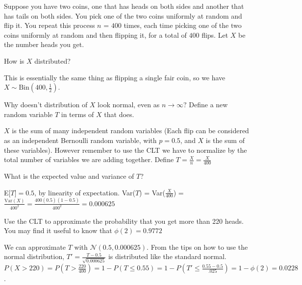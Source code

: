 Suppose you have two coins, one that has heads on both sides and another that has tails on both sides. You pick one of the two coins uniformly at random and flip it. You repeat this process $n$ = $400$ times, each time picking one of the two coins uniformly at random and then flipping it, for a total of $400$ flips. Let $X$ be the number heads you get.

\begin{question}
How is $X$ distributed?

\begin{solution}
This is essentially the same thing as flipping a single fair coin, so we have $X \mathtt{\sim} \mathrm{Bin}(400, \frac{1}{2})$.
\end{solution}
\end{question}

\begin{question}
Why doesn't distribution of $X$ look normal, even as $n \to \infty?$  Define a new random variable $T$ in terms of $X$ that does.

\begin{solution}
$X$ is the sum of many independent random variables (Each flip can be considered as an independent Bernoulli random variable, with $p = 0.5$, and $X$ is the sum of these variables). However remember to use the CLT we have to normalize by the total number of variables we are adding together. Define $T = \frac{X}{n} = \frac{X}{400}$
\end{solution}
\end{question}

\begin{question}
What is the expected value and variance of $T$?

\begin{solution}
E[$T] = 0.5$, by linearity of expectation. Var($T$) = Var($\frac{X}{400}$)  = $\frac{\text{Var}(X)}{400^2} = \frac{400(0.5)(1-0.5)}{400^2} = 0.000625$
\end{solution}
\end{question}

\begin{question}
Use the CLT to approximate the probability that you get more than 220 heads. You may find it useful to know that $\phi(2) = 0.9772$

\begin{solution}
We can approximate $T$ with $\mathcal{N}(0.5, 0.000625)$. From the tips on how to use the normal distribution, $T' = \frac{T-0.5}{\sqrt{0.000625}}$ is distributed like the standard normal. 
$P(X>220) = P(T>\frac{220}{400}) = 1 - P(T \leq 0.55) = 1 - P(T' \leq \frac{0.55-0.5}{.025}) = 1 - \phi(2) = 0.0228$.
\end{solution}
\end{question}

